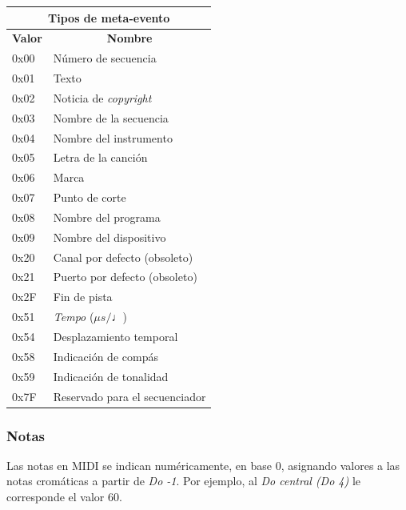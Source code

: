 \begin{center}
	\begin{tabular}{|l|l|}
		\hline \multicolumn{2}{|c|}{\textbf{Tipos de meta-evento}} \\
		\hline \multicolumn{1}{|c|}{\textbf{Valor}} & \multicolumn{1}{c|}{\textbf{Nombre}} \\
		\hline 0x00 & Número de secuencia \\
		\hline 0x01 & Texto \\
		\hline 0x02 & Noticia de \textit{copyright} \\
		\hline 0x03 & Nombre de la secuencia \\
		\hline 0x04 & Nombre del instrumento \\
		\hline 0x05 & Letra de la canción \\
		\hline 0x06 & Marca \\
		\hline 0x07 & Punto de corte \\
		\hline 0x08 & Nombre del programa \\
		\hline 0x09 & Nombre del dispositivo \\
		\hline 0x20 & Canal por defecto (obsoleto) \\
		\hline 0x21 & Puerto por defecto (obsoleto) \\
		\hline 0x2F & Fin de pista \\
		\hline 0x51 & \textit{Tempo} ($\mu s/\quarternote$) \\
		\hline 0x54 & Desplazamiento temporal \\
		\hline 0x58 & Indicación de compás \\
		\hline 0x59 & Indicación de tonalidad \\
		\hline 0x7F & Reservado para el secuenciador \\
		\hline 
	\end{tabular}
	\smallskip
\end{center}

\smallskip

\subsubsection{Notas}

Las notas en \acrshort{MIDI} se indican numéricamente, en base 0, asignando valores a las notas cromáticas a partir de \textit{Do -1}. Por ejemplo, al \textit{Do central (Do 4)} le corresponde el valor 60.

\newpage

